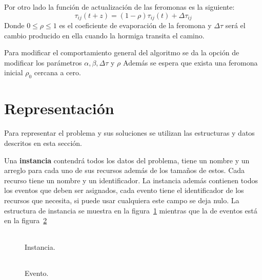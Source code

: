 \documentclass[letter, 10pt]{article}
\renewcommand{\bf}[1]{\textbf{#1}}
\begin{document}
Por otro lado la función de actualización de las feromonas es la siguiente:
\begin{equation} \label{eq:pher}
  \tau_{ij}(t+z) = (1-\rho)\tau_{ij}(t) + \Delta \tau_{ij}
\end{equation}
Donde $0 \leq \rho \leq 1$ es el coeficiente de evaporación de la feromona y
$\Delta\tau$ será el cambio producido en ella cuando la hormiga transita el
camino.

Para modificar el comportamiento general del algoritmo se da la opción de
modificar los parámetros $\alpha, \beta, \Delta\tau$ y $\rho$ Además se espera
que exista una feromona inicial $\rho_0$ cercana a cero.

\section{Representación}\label{sec:repr}
Para representar el problema y sus soluciones se utilizan las estructuras y
datos descritos en esta sección.

Una \bf{instancia} contendrá todos los datos del problema, tiene un nombre y un
arreglo para cada uno de sus recursos además de los tamaños de estos. Cada
recurso tiene un nombre y un identificador. La instancia además contienen todos
los eventos que deben ser asignados, cada evento tiene el identificador de los
recursos que necesita, si puede usar cualquiera este campo se deja nulo.
La estructura de instancia se muestra en la figura~\ref{fig:inst} mientras que
la de eventos está en la figura~\ref{fig:event}

\begin{figure}[htpb]
  \centering
  \begin{tabular}{c}
    
  \end{tabular}
  \caption{Instancia.}
  \label{fig:inst}
\end{figure}

\begin{figure}[htpb]
  \centering
  \begin{tabular}{c}
    
  \end{tabular}
  \caption{Evento.}
  \label{fig:event}
\end{figure}
\end{document}
